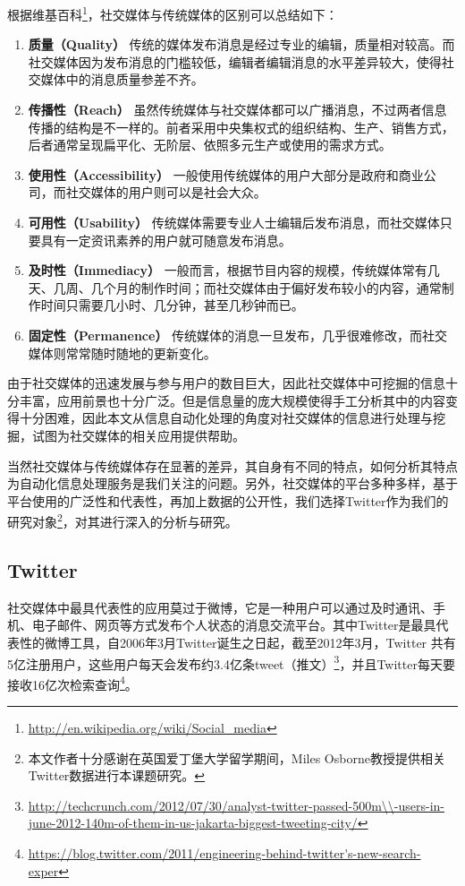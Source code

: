 根据维基百科\footnote{\url{http://en.wikipedia.org/wiki/Social_media}}，社交媒体与传统媒体的区别可以总结如下：
  \begin{enumerate}
    \item  \textbf{质量（Quality）} 传统的媒体发布消息是经过专业的编辑，质量相对较高。而社交媒体因为发布消息的门槛较低，编辑者编辑消息的水平差异较大，使得社交媒体中的消息质量参差不齐。
   \item  \textbf{传播性（Reach）} 虽然传统媒体与社交媒体都可以广播消息，不过两者信息传播的结构是不一样的。前者采用中央集权式的组织结构、生产、销售方式，后者通常呈现扁平化、无阶层、依照多元生产或使用的需求方式。
 \item  \textbf{使用性（Accessibility）} 一般使用传统媒体的用户大部分是政府和商业公司，而社交媒体的用户则可以是社会大众。
 \item  \textbf{可用性（Usability）} 传统媒体需要专业人士编辑后发布消息，而社交媒体只要具有一定资讯素养的用户就可随意发布消息。
\item  \textbf{及时性（Immediacy）} 一般而言，根据节目内容的规模，传统媒体常有几天、几周、几个月的制作时间；而社交媒体由于偏好发布较小的内容，通常制作时间只需要几小时、几分钟，甚至几秒钟而已。
\item  \textbf{固定性（Permanence）}  传统媒体的消息一旦发布，几乎很难修改，而社交媒体则常常随时随地的更新变化。
  \end{enumerate}  
  
由于社交媒体的迅速发展与参与用户的数目巨大，因此社交媒体中可挖掘的信息十分丰富，应用前景也十分广泛。但是信息量的庞大规模使得手工分析其中的内容变得十分困难，因此本文从信息自动化处理的角度对社交媒体的信息进行处理与挖掘，试图为社交媒体的相关应用提供帮助。

当然社交媒体与传统媒体存在显著的差异，其自身有不同的特点，如何分析其特点为自动化信息处理服务是我们关注的问题。另外，社交媒体的平台多种多样，基于平台使用的广泛性和代表性，再加上数据的公开性，我们选择Twitter作为我们的研究对象\footnote{本文作者十分感谢在英国爱丁堡大学留学期间，Miles Osborne教授提供相关Twitter数据进行本课题研究。}，对其进行深入的分析与研究。

\subsection{Twitter}
社交媒体中最具代表性的应用莫过于微博，它是一种用户可以通过及时通讯、手机、电子邮件、网页等方式发布个人状态的消息交流平台。其中Twitter是最具代表性的微博工具，自2006年3月Twitter诞生之日起，截至2012年3月，Twitter 共有5亿注册用户，这些用户每天会发布约3.4亿条tweet（推文）\footnote{\url{http://techcrunch.com/2012/07/30/analyst-twitter-passed-500m\\-users-in-june-2012-140m-of-them-in-us-jakarta-biggest-tweeting-city/}}，并且Twitter每天要接收16亿次检索查询\footnote{\url{https://blog.twitter.com/2011/engineering-behind-twitter's-new-search-exper}}。

